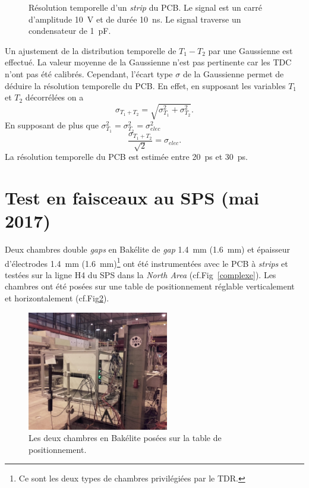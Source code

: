 \begin{figure}[!ht]
	\centering
	\caption{Résolution temporelle d'un \textit{strip} du PCB. Le signal est un carré d'amplitude \SI{10}{\volt} et de durée \SI{10}{\nano\second}. Le signal traverse un condensateur de \SI{1}{\pico\farad}.}
	\label{RESOLUTION}
\end{figure}

Un ajustement de la distribution temporelle de $T_{1}-T_{2}$ par une Gaussienne est effectué. La valeur moyenne de la Gaussienne n'est pas pertinente car les TDC n'ont pas été calibrés. Cependant, l'écart type $\sigma$ de la Gaussienne permet de déduire la résolution temporelle du PCB. En effet, en supposant les variables $T_1$ et $T_2$ décorrélées on a
\begin{equation}
\sigma_{T_1+T_2}=\sqrt{\sigma_{T_1}^2+\sigma_{T_2}^2}.
\end{equation}
En supposant de plus que $\sigma_{T_1}^2=\sigma_{T_2}^2=\sigma_{elec}^2$
\begin{equation}
\frac{\sigma_{T_1+T_2}}{\sqrt{2}}=\sigma_{elec}.
\end{equation}
La résolution temporelle du PCB est estimée entre \SI{20}{\pico\second} et \SI{30}{\pico\second}.

\section{Test en faisceaux au SPS (mai 2017)}
\label{TIMINGG}
\vspace{-0.4cm}
Deux chambres double \textit{gaps} en Bakélite de \textit{gap} \SI{1.4}{\milli\meter} (\SI{1.6}{\milli\meter}) et épaisseur d'électrodes \SI{1.4}{\milli\meter} (\SI{1.6}{\milli\meter})\footnote{Ce sont les deux types de chambres privilégiées par le TDR.} ont été instrumentées avec le PCB à \textit{strips} et testées sur la ligne H4 du SPS dans la \textit{North Area} (cf.Fig~\ref{complexe}). Les chambres ont été posées sur une table de positionnement réglable verticalement et horizontalement (cf.Fig\ref{setup2017}).
\begin{figure}[ht!]
	\centering
	\includegraphics[width=0.55\textwidth]{ELE/setup2017.jpg}
	\captionsetup{type=figure}\caption{Les deux chambres en Bakélite posées sur la table de positionnement.}
	\label{setup2017}
\end{figure}

